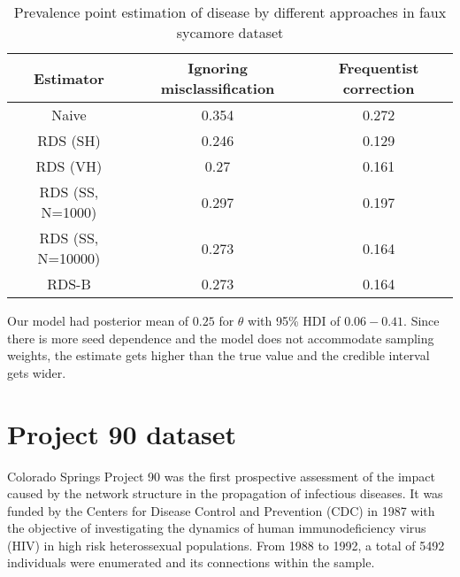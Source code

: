 \begin{table}[htbp]
    \centering
    \caption{\label{tab:results-estimators-faux-sycamore-data}Prevalence point estimation of
    disease by different approaches in faux sycamore dataset}
    \begin{tabular}{ccc}
        \hline
        Estimator & Ignoring misclassification & Frequentist correction \\ \hline
        Naive & 0.354 & 0.272 \\
        RDS (SH) & 0.246 & 0.129 \\
        RDS (VH) & 0.27 & 0.161 \\
        RDS (SS, N=1000) & 0.297 & 0.197 \\
        RDS (SS, N=10000) & 0.273 & 0.164 \\
        RDS-B & 0.273 & 0.164 \\ \hline
        \end{tabular}
\end{table}

Our model had posterior mean of $0.25$ for $\theta$ with 95\% HDI of $0.06 -
0.41$. Since there is more seed dependence and the model does not accommodate
sampling weights, the estimate gets higher than the true value and the
credible interval gets wider.

\section{Project 90 dataset}

Colorado Springs Project 90 was the first prospective assessment of the impact
caused by the network structure in the propagation of infectious diseases. It
was funded by the Centers for Disease Control and Prevention (CDC) in 1987
with the objective of investigating the dynamics of human immunodeficiency
virus (HIV) in high risk heterossexual populations. From 1988 to 1992, a total
of 5492 individuals were enumerated and its connections within the sample. 